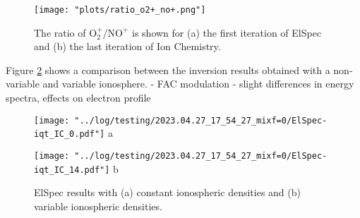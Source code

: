 \documentclass[10pt, a4paper]{article}
\numberwithin{equation}{section}										%
\begin{document}
\begin{figure}
	\centering
	\texttt{[image: "plots/ratio\_o2+\_no+.png"]}
	\caption{The ratio of $\mathrm{O_2^+/NO^+}$ is shown for (a) the first iteration of ElSpec and (b) the last iteration of Ion Chemistry.}
	\label{fig:ratio_o2p_nop}
\end{figure}
%
\par\medskip
%
Figure \ref{fig:comp} shows a comparison between the inversion results obtained with a non-variable and variable ionosphere. 
- FAC modulation
- slight differences in energy spectra, effects on electron profile
\begin{figure}
	\centering
    	\begin{minipage}{0.5\textwidth}
			\centering
			\texttt{[image: "../log/testing/2023.04.27\_17\_54\_27\_mixf=0/ElSpec-iqt\_IC\_0.pdf"]}
			a
    	\end{minipage}%
    	\begin{minipage}{0.5\textwidth}
        	\centering
			\texttt{[image: "../log/testing/2023.04.27\_17\_54\_27\_mixf=0/ElSpec-iqt\_IC\_14.pdf"]}
			b
    	\end{minipage}
    \caption{ElSpec results with (a) constant ionospheric densities and (b) variable ionospheric densities.}
    \label{fig:comp}
\end{figure}
\end{document}
